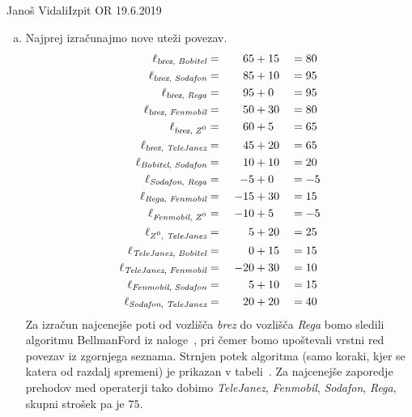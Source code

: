 \begin{naloga}{Janoš Vidali}{Izpit OR 19.6.2019}
\begin{odgovor}
\begin{enumerate}[(a)]
\item Najprej izračunajmo nove uteži povezav.
\begin{alignat*}{3}
\ell_{\text{{\sl brez}, {\em Bobitel}}}       &=\ &  65 &+ 15 &&= 80 \\
\ell_{\text{{\sl brez}, {\em Sodafon}}}       &=\ &  85 &+ 10 &&= 95 \\
\ell_{\text{{\sl brez}, {\em Rega}}}          &=\ &  95 &+  0 &&= 95 \\
\ell_{\text{{\sl brez}, {\em Fenmobil}}}      &=\ &  50 &+ 30 &&= 80 \\
\ell_{\text{{\sl brez}, {\em $Z^0$}}}         &=\ &  60 &+  5 &&= 65 \\
\ell_{\text{{\sl brez}, {\em TeleJanez}}}     &=\ &  45 &+ 20 &&= 65 \\
\ell_{\text{{\em Bobitel}, {\em Sodafon}}}    &=\ &  10 &+ 10 &&= 20 \\
\ell_{\text{{\em Sodafon}, {\em Rega}}}       &=\ &  -5 &+  0 &&= -5 \\
\ell_{\text{{\em Rega}, {\em Fenmobil}}}      &=\ & -15 &+ 30 &&= 15 \\
\ell_{\text{{\em Fenmobil}, {\em $Z^0$}}}     &=\ & -10 &+  5 &&= -5 \\
\ell_{\text{{\em $Z^0$}, {\em TeleJanez}}}    &=\ &   5 &+ 20 &&= 25 \\
\ell_{\text{{\em TeleJanez}, {\em Bobitel}}}  &=\ &   0 &+ 15 &&= 15 \\
\ell_{\text{{\em TeleJanez}, {\em Fenmobil}}} &=\ & -20 &+ 30 &&= 10 \\
\ell_{\text{{\em Fenmobil}, {\em Sodafon}}}   &=\ &   5 &+ 10 &&= 15 \\
\ell_{\text{{\em Sodafon}, {\em TeleJanez}}}  &=\ &  20 &+ 20 &&= 40
\end{alignat*}
Za izračun najcenejše poti od vozlišča {\sl brez} do vozlišča {\em Rega}
bomo sledili algoritmu {\sc BellmanFord} iz naloge~\res[bf],
pri čemer bomo upoštevali vrstni red povezav iz zgornjega seznama.
Strnjen potek algoritma
(samo koraki, kjer se katera od razdalj spremeni)
je prikazan v tabeli~\tab.
Za najcenejše zaporedje prehodov med operaterji tako dobimo
{\em TeleJanez}, {\em Fenmobil}, {\em Sodafon}, {\em Rega},
skupni strošek pa je $75$.
%
\begin{tabela}
\end{tabela}
\end{enumerate}
\end{odgovor}
\end{naloga}
